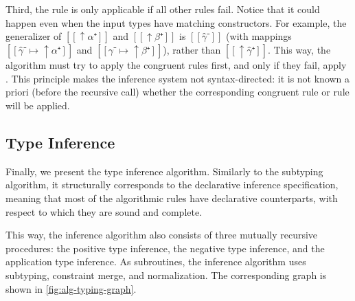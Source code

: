   Third, the rule is only applicable if all other rules fail. 
  Notice that it could happen even when the input types have matching constructors. 
  For example, the generalizer of $[[↑α⁺]]$ and
  $[[↑β⁺]]$ is $[[γ̂⁻]]$ (with mappings $[[γ̂⁻ ↦ ↑α⁺]]$ and $[[γ̂⁻ ↦ ↑β⁺]]$),
  rather than $[[↑γ̂⁺]]$. This way, the algorithm must try to 
  apply the congruent rules first, and only if they fail,
  apply .
  This principle makes the inference system not syntax-directed:
  it is not known a priori (before the recursive call) 
  whether the corresponding congruent rule or rule  
  will be applied.

\subsection{Type Inference}
\label{sec:typing}

Finally, we present the type inference algorithm. 
Similarly to the subtyping algorithm, it structurally corresponds to the declarative
inference specification, meaning that most of the algorithmic rules have
declarative counterparts, with respect to which they are sound and complete.

This way, the inference algorithm also consists of three mutually recursive procedures: 
the positive type inference, the negative type inference, and the
application type inference. As subroutines, the inference algorithm uses
subtyping, constraint merge, and normalization.  
The corresponding graph is shown in \cref{fig:alg-typing-graph}.

